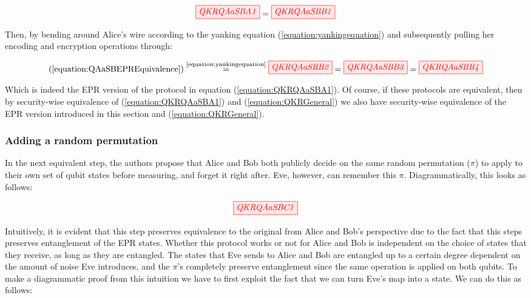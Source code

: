 \documentclass[]{article}
\newcommand{\equaltext}[1]{\ensuremath{\stackrel{\text{#1}}{=}}}
\begin{document}
\begin{equation}
	\label{equation:QAaSBEPREquivalence}
	\begin{aligned}
	\tikzfig{QKRQAaSBA1} = \tikzfig{QKRQAaSBB1}
	\end{aligned}
\end{equation}

Then, by bending around Alice's wire according to the yanking equation (\ref{equation:yankingequation}) and subsequently pulling her encoding and encryption operations through:

\begin{equation}
\label{equation:EPRQKR}
	\begin{aligned}
 (\ref{equation:QAaSBEPREquivalence}) \equaltext{\ref{equation:yankingequation}}\tikzfig{QKRQAaSBB2} = \tikzfig{QKRQAaSBB3} = \tikzfig{QKRQAaSBB4}
\end{aligned}
\end{equation}

Which is indeed the EPR version of the protocol in equation (\ref{equation:QKRQAaSBA1}). Of course, if these protocols are equivalent, then by security-wise equivalence of (\ref{equation:QKRQAaSBA1}) and (\ref{equation:QKRGeneral}) we also have security-wise equivalence of the EPR version introduced in this section and (\ref{equation:QKRGeneral}). 

\subsubsection{Adding a random permutation}

In the next equivalent step, the authors propose that Alice and Bob both publicly decide on the same random permutation ($\pi$) to apply to their own set of qubit states before measuring, and forget it right after. Eve, however, can remember this $\pi$. Diagrammatically, this looks as follows:

\begin{equation}
	\label{equation:QKRQAaSBC1}
	\tikzfig{QKRQAaSBC1}
\end{equation}

Intuitively, it is evident that this step preserves equivalence to the original from Alice and Bob's perspective due to the fact that this steps preserves entanglement of the EPR states. Whether this protocol works or not for Alice and Bob is independent on the choice of states that they receive, as long as they are entangled. The states that Eve sends to Alice and Bob are entangled up to a certain degree dependent on the amount of noise Eve introduces, and the $\pi$'s completely preserve entanglement since the same operation is applied on both qubits. To make a diagrammatic proof from this intuition we have to first exploit the fact that we can turn Eve's map into a state. We can do this as follows:
\end{document}
